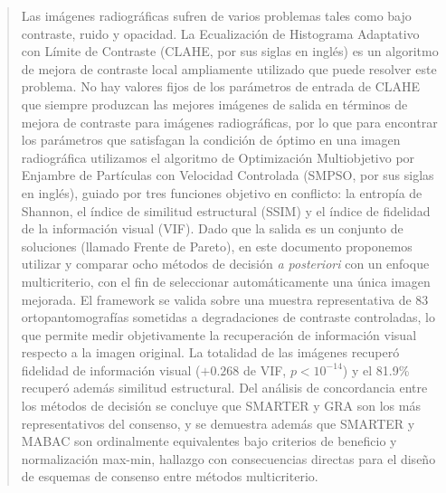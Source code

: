 \documentclass[sigplan,screen]{acmart}
\begin{document}
\begin{abstract}
  Las imágenes radiográficas sufren de varios problemas tales como bajo contraste, ruido y opacidad. La Ecualización de Histograma Adaptativo con Límite de Contraste (CLAHE, por sus siglas en inglés) es un algoritmo de mejora de contraste local ampliamente utilizado que puede resolver este problema. No hay valores fijos de los parámetros de entrada de CLAHE que siempre produzcan las mejores imágenes de salida en términos de mejora de contraste para imágenes radiográficas, por lo que para encontrar los parámetros que satisfagan la condición de óptimo en una imagen radiográfica utilizamos el algoritmo de Optimización Multiobjetivo por Enjambre de Partículas con Velocidad Controlada (SMPSO, por sus siglas en inglés), guiado por tres funciones objetivo en conflicto: la entropía de Shannon, el índice de similitud estructural (SSIM) y el índice de fidelidad de la información visual (VIF). Dado que la salida es un conjunto de soluciones (llamado Frente de Pareto), en este documento proponemos utilizar y comparar ocho métodos de decisión \textit{a posteriori} con un enfoque multicriterio, con el fin de seleccionar automáticamente una única imagen mejorada. El framework se valida sobre una muestra representativa de 83 ortopantomografías sometidas a degradaciones de contraste controladas, lo que permite medir objetivamente la recuperación de información visual respecto a la imagen original. La totalidad de las imágenes recuperó fidelidad de información visual ($+0.268$ de VIF, $p<10^{-14}$) y el 81.9\% recuperó además similitud estructural. Del análisis de concordancia entre los métodos de decisión se concluye que SMARTER y GRA son los más representativos del consenso, y se demuestra además que SMARTER y MABAC son ordinalmente equivalentes bajo criterios de beneficio y normalización max-min, hallazgo con consecuencias directas para el diseño de esquemas de consenso entre métodos multicriterio.
\end{abstract}



\maketitle
\end{document}
